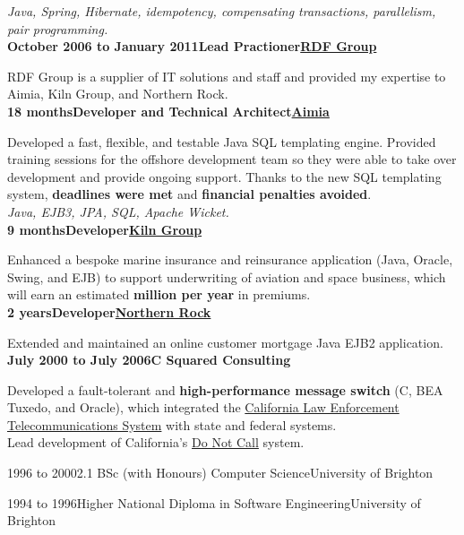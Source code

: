 \documentclass[a4paper,12pt]{article}
\newcommand{\head}[1]{\needspace{6em}\begin{center}{\large{\textbf{\sc{#1}}}}\nopagebreak\end{center}}
\newcommand{\jobheld}[2]{\textbf{#1\hfill #2}\nopagebreak}
\newcommand{\clientwork}[3]{\textbf{#1\hfill#3\hfill#2}\nopagebreak}
\newcommand{\tab}{\hspace{2em}}
\newcommand{\education}[3]{#1\tab#2\hfill#3}
\newcommand{\techstack}[1]{\textit{#1}}
\begin{document}
\techstack{Java, Spring, Hibernate, idempotency, compensating transactions, parallelism, pair programming.}\\

\clientwork{October 2006 to January 2011}{\href{http://www.rdfgroup.com/}{RDF Group}}{Lead Practioner}

RDF Group is a supplier of IT solutions and staff and provided my expertise to Aimia, Kiln Group, and Northern Rock.\\

\clientwork{18 months}{\href{http://www.aimia.com/}{Aimia}}{Developer and Technical Architect}

Developed a fast, flexible, and testable Java SQL templating engine. Provided training sessions for the offshore development team so they were able to take over development and provide ongoing support. Thanks to the new SQL templating system, \textbf{deadlines were met} and \textbf{financial penalties avoided}. \\

\techstack{Java, EJB3, JPA, SQL, Apache Wicket.}\\

\clientwork{9 months}{\href{http://www.tokiomarinekiln.com/}{Kiln Group}}{Developer}

Enhanced a bespoke marine insurance and reinsurance application (Java, Oracle, Swing, and EJB) to support underwriting of aviation and space business, which will earn an estimated \textbf{ million per year} in premiums.\\

\clientwork{2 years}{\href{http://www.northernrock.co.uk}{Northern Rock}}{Developer}

Extended and maintained an online customer mortgage Java EJB2 application.\\

\jobheld{July 2000 to July 2006}{C Squared Consulting}

Developed a fault-tolerant and \textbf{high-performance message switch} (C, BEA Tuxedo, and Oracle), which integrated the \href{http://definitions.uslegal.com/c/clets/}{California Law Enforcement Telecommunications System} with state and federal systems.\\

Lead development of California's \href{http://www.sfgate.com/cgi-bin/article.cgi?f=/c/a/2003/03/31/MN5478.DTL}{Do Not Call} system.\\

\head{Education}

\education{1996 to 2000}{2.1 BSc (with Honours) Computer Science}{University of Brighton}

\education{1994 to 1996}{Higher National Diploma in Software Engineering}{University of Brighton}
\end{document}
